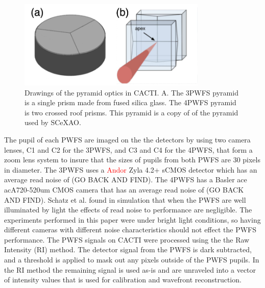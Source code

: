 \documentclass[12pt]{spieman}  %
\newcommand{\jrmadd}[1]{\textcolor{red}{#1}}
\begin{document}
\begin{spacing}{2}
\begin{figure}
    \centering
    \includegraphics[width=0.8\textwidth]{pyramidOptics.png}
    \caption{Drawings of the pyramid optics in CACTI. A. The 3PWFS pyramid is a single prism made from fused silica glass. The 4PWFS pyramid is two crossed roof prisms. This pyramid is a copy of of the pyramid used by SCeXAO. }
    \label{fig:pyramidOptics}
\end{figure}


The pupil of each PWFS are imaged on the the detectors by using two camera lenses, C1 and C2 for the 3PWFS, and C3 and C4 for the 4PWFS,  that form a zoom lens system to insure that the sizes of pupils from both PWFS are 30 pixels in diameter. The 3PWFS uses a \jrmadd{Andor} Zyla 4.2+ sCMOS detector which has an average read noise of (GO BACK AND FIND). The 4PWFS has a Basler ace acA720-520um CMOS camera that has an average read noise of (GO BACK AND FIND). Schatz et al. found in simulation that when the PWFS are well illuminated by light the effects of read noise to performance are negligible. The experiments performed in this paper were under bright light conditions, so having different cameras with different noise characteristics should not effect the PWFS performance. The PWFS signals on CACTI were processed using the the Raw Intensity (RI) method. The detector signal from the PWFS is dark subtracted, and a threshold is applied to mask out any pixels outside of the PWFS pupils. In the RI method the remaining signal is used as-is and are unraveled into a vector of intensity values that is used for calibration and wavefront reconstruction.





\end{spacing}
\end{document}
